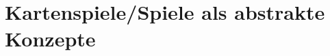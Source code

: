 
\section{Kartenspiele/Spiele als abstrakte Konzepte}\label{sec:abstrakte-konzepte}

\renewcommand{\kapitelautor}{Autor: Irgendwer} %

%
%

\renewcommand{\kapitelautor}{}
